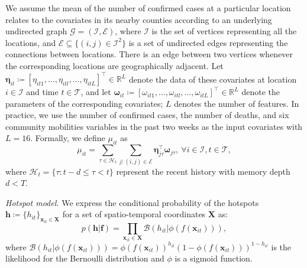 \documentclass[journal]{IEEEtran}
\begin{document}
We assume the mean of the number of confirmed cases at a particular location relates to the covariates in its nearby counties according to an underlying undirected graph $\mathscr{G} = (\mathscr{I}, \mathscr{E})$, where $\mathscr{I}$ is the set of vertices representing all the locations, and $\mathscr{E} \subseteq \{(i, j) \in \mathscr{I}^2\} $ is a set of undirected edges representing the connections between locations.
There is an edge between two vertices whenever the corresponding locations are geographically adjacent.
Let 
$\boldsymbol{\eta}_{it} \coloneqq [\eta_{it1},\dots,\eta_{itl},\dots,\eta_{itL}]^\top \in \mathbb{R}^L$ denote the data of these covariates at location $i \in \mathscr{I}$ and time $t \in \mathscr{T}$, and let
$\boldsymbol{\omega}_{it} \coloneqq [\omega_{it1}, \dots, \omega_{itl}, \dots, \omega_{itL}]^\top \in \mathbb{R}^L$ denote the parameters of the corresponding covariates; 
$L$ denotes the number of features. 
In practice, we use the number of confirmed cases, the number of deaths, and six community mobilities variables in the past two weeks as the input covariates with $L = 16$. 
Formally, we define $\mu_{it}$ as 
\begin{equation}
    \mu_{it} = \sum_{\tau \in \mathcal{H}_t} \sum_{j:(i,j)\in \mathscr{E}} \boldsymbol \eta_{j \tau}^\top \boldsymbol\omega_{j\tau},~\forall i \in \mathscr{I}, t \in \mathscr{T},
    \label{eq:mean}
\end{equation}
where $\mathcal{H}_t = \{\tau: t-d \le \tau < t \}$ represent the recent history with memory depth $d < T$.


\vspace{.1in}
\noindent\emph{Hotspot model.}
We express the conditional probability of the hotspots $\mathbf{h} \coloneqq \{h_{it}\}_{\mathbf{x}_{it} \in \mathbf{X}}$ for a set of spatio-temporal coordinates $\mathbf{X}$ as:
\begin{equation}
    p(\mathbf{h}|\mathbf{f}) = \prod_{\mathbf{x}_{it} \in \mathbf{X}} \mathcal{B}(h_{it}|\phi(f(\mathbf{x}_{it}))),
    \label{eq:h-conditional-f}
\end{equation}
where $\mathcal{B}(h_{it}|\phi(f(\mathbf{x}_{it}))) = \phi(f(\mathbf{x}_{it}))^{h_{it}} (1-\phi(f(\mathbf{x}_{it})))^{1-h_{it}}$ is the likelihood for the Bernoulli distribution and $\phi$ is a sigmoid function. 
\end{document}
